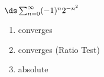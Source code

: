 {$\ds \sum_{n=0}^\infty (-1)^n2^{-n^2}$
}
{\begin{enumerate}
	\item converges
	\item	converges (Ratio Test)
	\item absolute
\end{enumerate}
}